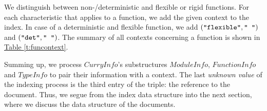 \documentclass[%
	latex,%
	a4paper,%
	oneside,%
	chapterprefix,%
	headsepline,%
	12pt%
]{scrbook}
\newcommand{\Conid}[1]{\mathit{#1}}
\begin{document}
\begin{table}[h]
\caption{The contexts for a \ensuremath{\Conid{TypeInfo}} data structure}
\label{t:typcontext}
\end{table}

We distinguish between non-/deterministic and flexible or rigid
functions. %
For each characteristic that applies to a function, we add the given
context to the index. %
In case of a deterministic and flexible function, we
add \ensuremath{(\text{\tt \char34 flexible\char34},\text{\tt \char34 ~\char34})} and \ensuremath{(\text{\tt \char34 det\char34},\text{\tt \char34 ~\char34})}. %
The summary of all contexts concerning a function is shown in
\hyperref[t:funcontext]{Table \ref{t:funcontext}}.

\begin{table}[h]
\caption{The contexts for a \ensuremath{\Conid{FunctionInfo}} data structure}
\label{t:funcontext}
\end{table}

Summing up, we process \ensuremath{\Conid{CurryInfo}}'s substructures \ensuremath{\Conid{ModuleInfo}},
\ensuremath{\Conid{FunctionInfo}} and \ensuremath{\Conid{TypeInfo}} to pair their information with a
context. %
The last \emph{unknown value} of the indexing process is the third
entry of the triple: the reference to the document. %
Thus, we segue from the index data structure into the next section,
where we discuss the data structure of the documents. %
\end{document}
